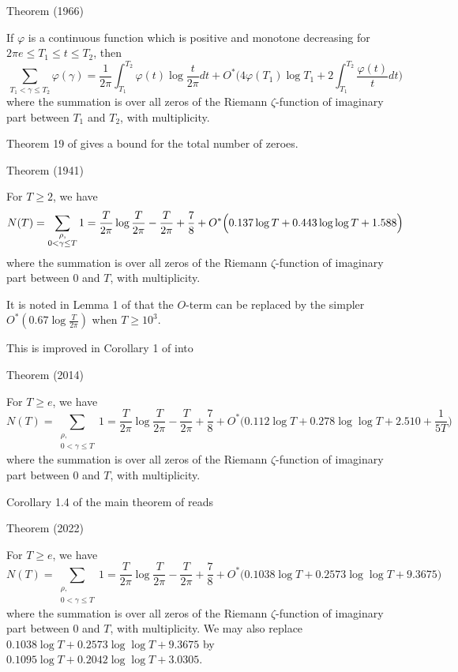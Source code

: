 \begin{thm}{Theorem (1966)}

If $\varphi$ is a continuous function which is positive and monotone
decreasing for $2\pi e\le T_1\le t\le T_2$, then
$$
\sum_{T_1 < \gamma\le T_2} \varphi(\gamma)
            =\frac{1}{2\pi}\int_{T_1}^{T_2}\varphi(t)\log\frac{t}{2\pi}dt
            +O^*\biggl(4\varphi(T_1)\log
            T_1+2\int_{T_1}^{T_2}\frac{\varphi(t)}{t}
            dt\biggr)
            $$
             where the summation is over all zeros of the Riemann
            $\zeta$-function of
            imaginary part between $T_1$ and $T_2$, with multiplicity.
\end{thm}


Theorem 19 of
\cite{Rosser*41}
gives a bound for the total number of zeroes.

\begin{thm}{Theorem (1941)}

For $T\ge2$, we have
$$
N(T)=\sum_{\substack{\rho,\\ 0 < \gamma\le T}} 1=
            \frac{T}{2\pi}\log\frac{T}{2\pi}-\frac{T}{2\pi}+\frac{7}{8}
            +O^*\Bigl(0.137\log T+0.443\log\log T+1.588
            \Bigr)
            $$
            where the summation is over all zeros of the Riemann
            $\zeta$-function of
            imaginary part between 0 and $T$, with multiplicity.
\end{thm}


It is noted in Lemma 1 of
\cite{Ramare-Saouter*02}
that the $O$-term can be replaced by the simpler
$O^*(0.67\log\frac{T}{2\pi})$ when $T\ge 10^3$.

This is improved in Corollary 1 of
\cite{Trudgian*13}
into
\begin{thm}{Theorem (2014)}

For $T\ge e$, we have
$$
N(T)=\sum_{\substack{\rho,\\ 0 < \gamma\le T}} 1=
            \frac{T}{2\pi}\log\frac{T}{2\pi}-\frac{T}{2\pi}+\frac{7}{8}
            +O^*\bigl(0.112\log T+0.278\log\log T+2.510+\frac{1}{5T}
            \bigr)
            $$
            where the summation is over all zeros of the Riemann
            $\zeta$-function of
            imaginary part between 0 and $T$, with multiplicity.
\end{thm}



Corollary 1.4 of the main theorem of
\cite{Hasanalizade-Shen-Wong*22}
reads
\begin{thm}{Theorem (2022)}

For $T\ge e$, we have
$$
N(T)=\sum_{\substack{\rho,\\ 0 < \gamma\le T}} 1=
            \frac{T}{2\pi}\log\frac{T}{2\pi}-\frac{T}{2\pi}+\frac{7}{8}
            +O^*\bigl(0.1038\log T+0.2573\log\log T+9.3675
            \bigr)
            $$
            where the summation is over all zeros of the Riemann
            $\zeta$-function of
				 imaginary part between 0 and $T$, with multiplicity.
				 We may also replace $0.1038\log
				 T+0.2573\log\log T+9.3675$ by $0.1095\log T+0.2042\log\log T+3.0305$.
\end{thm}



